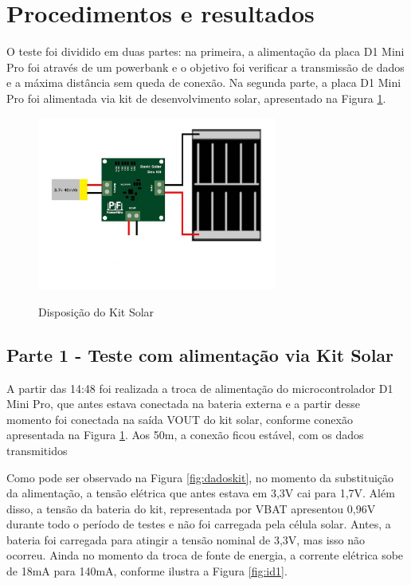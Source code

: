 \documentclass[11pt,a4paper]{article}
\begin{document}
\section{Procedimentos e resultados}

O teste foi dividido em duas partes: na primeira, a alimentação da placa D1 Mini Pro foi através de um powerbank e o objetivo foi verificar a transmissão de dados e a máxima distância sem queda de conexão. Na segunda parte, a placa D1 Mini Pro foi alimentada via kit de desenvolvimento solar, apresentado na Figura \ref{fig:kitsolar1}.

\begin{figure}[hbt]
	\centering
		\caption{Disposição do Kit Solar}
		\includegraphics[width=0.7\textwidth]{kitsolar1.jpg} 
		\label{fig:kitsolar1} 
\end{figure}  


\subsection{Parte 1 - Teste com alimentação via Kit Solar}

A partir das 14:48 foi realizada a troca de alimentação do microcontrolador D1 Mini Pro, que antes estava conectada na bateria externa e a partir desse momento foi conectada na saída VOUT do kit solar, conforme conexão apresentada na Figura \ref{fig:kitsolar1}. Aos 50m, a conexão ficou estável, com os dados transmitidos



Como pode ser observado na Figura \ref{fig:dadoskit}, no momento da substituição da alimentação, a tensão elétrica que antes estava em 3,3V cai para 1,7V. Além disso, a tensão da bateria do kit, representada por VBAT apresentou 0,96V durante todo o período de testes e não foi carregada pela célula solar. Antes, a bateria foi carregada para atingir a tensão nominal de 3,3V, mas isso não ocorreu. Ainda no momento da troca de fonte de energia, a corrente elétrica sobe de 18mA para 140mA, conforme ilustra a Figura \ref{fig:id1}. 
\end{document}
